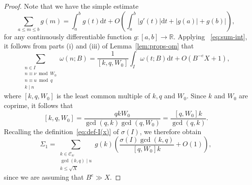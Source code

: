 \documentclass[11pt,letterpaper]{amsart}
\renewcommand{\leq}{\leqslant}
\renewcommand{\d}{\mathrm{d}}
\theoremstyle{definition}
\numberwithin{equation}{section}
\newcommand\RR{\mathbb{R}}
\DeclareMathOperator{\n}{N}
\newcommand{\0}{\mathbf{0}}
\begin{document}
\begin{proof}
Note that we have the simple estimate
\begin{equation}\label{eq:sum-int}
\sum_{a\leq m\leq  b}g(m) =\int_a^b g(t)\d t +O\left(\int_a^b |g'(t)|\d t +|g(a)|+g(b)|\right),
\end{equation}
for any continuously  differentiable function $g:[a,b]\to \RR$. Applying ~\eqref{eq:sum-int}, it follows from parts (i) and (iii) of Lemma~\ref{lem:props-om} that
$$
\sum_{\substack{n\in I
\\ n\equiv \nu\bmod{W_0}\\n\equiv u\bmod{q}\\
k\mid n}}  \omega(n;B)=
\frac{1}{[k,q,W_0]}\int_{I} \omega(t;B)\d t+O(B^{-e}X+1),
$$
where $[k,q,W_0]$ is the least common multiple of $k,q$ and $W_0$.
Since $k$ and $W_0$ are coprime,
it follows that 
$$
[k,q,W_0]=\frac{qkW_0}{\gcd(q,k)\gcd(q,W_0)}=\frac{[q,W_0]k}{\gcd(q,k)}.
$$
Recalling the definition~\eqref{eq:def-I(x)} of $\sigma(I)$, we therefore obtain
 $$
 \Sigma_1
= \sum_{\substack{k\in \mathcal{C}_w\\ \gcd(k,q)\mid u\\ k\leq \sqrt{X}}} g(k) 
\left(\frac{\sigma(I)\gcd(k,q)}{[q,W_0]k}  +O(1)\right),
$$
since we are assuming that $B^e\gg X$.


\end{proof}
\end{document}
